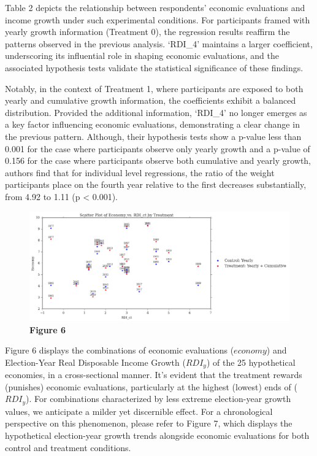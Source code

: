 \documentclass[
]{article}
\begin{document}


Table 2 depicts the relationship between respondents' economic
evaluations and income growth under such experimental conditions. For
participants framed with yearly growth information (Treatment 0), the
regression results reaffirm the patterns observed in the previous
analysis. `RDI\_4' maintains a larger coefficient, underscoring its
influential role in shaping economic evaluations, and the associated
hypothesis tests validate the statistical significance of these
findings.

Notably, in the context of Treatment 1, where participants are exposed
to both yearly and cumulative growth information, the coefficients
exhibit a balanced distribution. Provided the additional information,
`RDI\_4' no longer emerges as a key factor influencing economic
evaluations, demonstrating a clear change in the previous pattern.
Although, their hypothesis tests show a p-value less than 0.001 for the
case where participants observe only yearly growth and a p-value of
0.156 for the case where participants observe both cumulative and yearly
growth, authors find that for individual level regressions, the ratio of
the weight participants place on the fourth year relative to the first
decreases substantially, from 4.92 to 1.11 (p \textless{} 0.001).

\begin{figure}
\centering
\includegraphics{difcuma.png}
\caption{\textbf{Figure 6}}
\end{figure}

Figure 6 displays the combinations of economic evaluations (\(economy\))
and Election-Year Real Disposable Income Growth (\(RDI_y\)) of the 25
hypothetical economies, in a cross-sectional manner. It's evident that
the treatment rewards (punishes) economic evaluations, particularly at
the highest (lowest) ends of (\(RDI_y\)). For combinations characterized
by less extreme election-year growth values, we anticipate a milder yet
discernible effect. For a chronological perspective on this phenomenon,
please refer to Figure 7, which displays the hypothetical election-year
growth trends alongside economic evaluations for both control and
treatment conditions.
\end{document}
